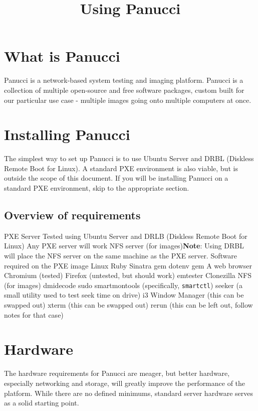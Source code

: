 \documentclass{article}
\def\code#1{\texttt{#1}}
\begin{document}
\title{Using Panucci}
\maketitle
\begin{flushleft}
\section{What is Panucci}


Panucci is a network-based system testing and imaging platform.\linebreak\linebreak
Panucci is a collection of multiple open-source and free software packages, custom built for our particular use case - multiple images going onto multiple computers at once.\pagebreak

\section{Installing Panucci}
The simplest way to set up Panucci is to use Ubuntu Server and DRBL (Diskless Remote Boot for Linux).  A standard PXE environment is also viable, but is outside the scope of this document.  If you will be installing Panucci on a standard PXE environment, skip to the appropriate section.
\subsection{Overview of requirements}
\begin{outline}
  \1 PXE Server
\2 Tested using Ubuntu Server and DRLB (Diskless Remote Boot for Linux)
\2 Any PXE server will work
  \1 NFS server (for images)\linebreak\textbf{Note}: Using DRBL will place the NFS server on the same machine as the PXE server.
  \1 Software required on the PXE image
\2 Linux
\2 Ruby
  \3 Sinatra gem
  \3 dotenv gem
\2 A web browser
  \3 Chromium (tested)
  \3 Firefox (untested, but should work)
\2 emtester
\2 Clonezilla
\2 NFS (for images)
\2 dmidecode
\2 sudo
\2 smartmontools (specifically, \code{smartctl})
\2 seeker (a small utility used to test seek time on drive)
\2 i3 Window Manager (this can be swapped out)
\2 xterm (this can be swapped out)
\2 rerun (this can be left out, follow notes for that case)
\end{outline}\pagebreak

\section{Hardware}
The hardware requirements for Panucci are meager, but better hardware, especially networking and storage, will greatly improve the performance of the platform.  While there are no defined minimums, standard server hardware serves as a solid starting point.

\end{flushleft}
\end{document}
